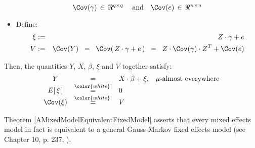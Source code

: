 \begin{theorem}
\begin{itemize}
	\begin{equation*}
	\Cov(\gamma) \,\in\, \Re^{q \times q}\;
	\quad\textnormal{and}\quad
	\Cov(e) \,\in\, \Re^{n \times n}
	\end{equation*}
\item
	Define:
	\begin{eqnarray*}
	\xi & := & Z \cdot \gamma + e
	\\
	V & := & \Cov(Y) \;\; = \;\; \Cov\!\left(\,Z\cdot\gamma+e\,\right) \;\; = \;\; Z \cdot \Cov(\gamma) \cdot Z^{T} + \Cov(e)
	\end{eqnarray*}
\end{itemize}
Then, the quantities $Y$, $X$, $\beta$, $\xi$ and $V$ together satisfy:
	\begin{equation*}
	\begin{array}{ccll}
	Y & = & X \cdot \beta + \xi, & \textnormal{$\mu$-almost everywhere}
	\\
	E\!\left[\,\xi\,\right] &\overset{{\color{white}\vert}}{=}& 0
	\\
	\Cov\!\left(\xi\right) &\overset{{\color{white}\vert}}{=}& V
	\end{array}
	\end{equation*}
\end{theorem}


\begin{remark}
\mbox{}\vskip 0.0cm \noindent
Theorem \ref{AMixedModelEquivalentFixedModel} asserts that every mixed effects model
in fact is equivalent to a {\color{red}general Gauss-Markov} fixed effects model
(see Chapter 10, p. 237, \cite{Christensen2011}).
\end{remark}


\renewcommand{\theenumi}{\roman{enumi}}
\renewcommand{\labelenumi}{\textnormal{(\theenumi)}$\;\;$}

